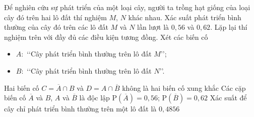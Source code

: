 \begin{ex}%

	Để nghiên cứu sự phát triển của một loại cây, người ta trồng hạt giống của loại cây đó trên hai lô đất thí nghiệm $M$, $N$ khác nhau. Xác suất phát triển bình thường của cây đó trên các lô đất $M$ và $N$ lần lượt là $0{,}56$ và $0{,}62$. Lặp lại thí nghiệm trên với đầy đủ các điều kiện tương đồng. Xét các biến cố
	\begin{itemize}
		\item $A\colon$ \lq\lq Cây phát triển bình thường trên lô đất $M$\rq\rq;
		\item $B\colon$ \lq\lq Cây phát triển bình thường trên lô đất $N$\rq\rq.
	\end{itemize}
	\choiceTF
	{Hai biến cố $C=\overline{A} \cap B$ và $D=A \cap \overline{B}$ không là hai biến cố xung khắc}
	{\True Các cặp biến cố $\overline{A}$ và $B$, $A$ và $\overline{B}$ là độc lập}
	{$\mathrm{P}(\overline{A})=0{,}56$; $\mathrm{P}(\overline{B})=0{,}62$}
	{\True Xác suất để cây chỉ phát triển bình thường trên một lô đất là $0{,}4856$}
\end{ex}

